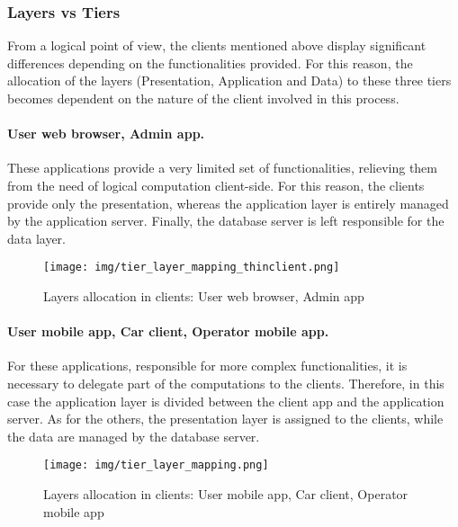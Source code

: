 \subsubsection{Layers vs Tiers}
	From a logical point of view, the clients mentioned above display significant differences depending on the functionalities provided. For this reason, the allocation of the layers (Presentation, Application and Data) to these three tiers becomes dependent on the nature of the client involved in this process.

	\paragraph{User web browser, Admin app.} These applications provide a very limited set of functionalities, relieving them from the need of logical computation client-side. For this reason, the clients provide only the presentation, whereas the application layer is entirely managed by the application server. Finally, the database server is left responsible for the data layer.
		\begin{figure}[h]
			\texttt{[image: img/tier\_layer\_mapping\_thinclient.png]}
			\caption{Layers allocation in clients: User web browser, Admin app}
		\end{figure}

	\paragraph{User mobile app, Car client, Operator mobile app.} For these applications, responsible for more complex functionalities, it is necessary to delegate part of the computations to the clients. Therefore, in this case the application layer is divided between the client app and the application server. As for the others, the presentation layer is assigned to the clients, while the data are managed by the database server.
		\begin{figure}[h]
			\texttt{[image: img/tier\_layer\_mapping.png]}
			\caption{Layers allocation in clients: User mobile app, Car client, Operator mobile app}
		\end{figure}
\FloatBarrier
